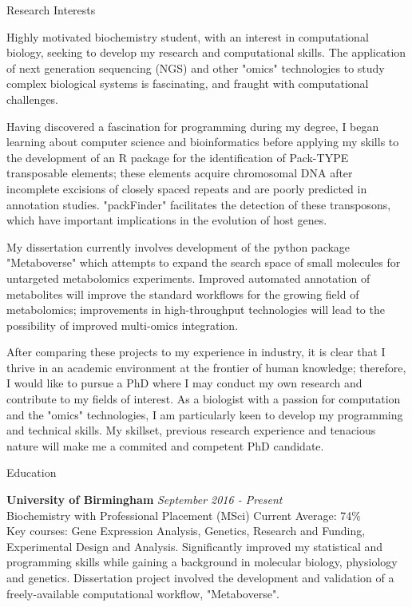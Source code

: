 \documentclass{resume}
\begin{document}
\begin{rSection}{Research Interests}

Highly motivated biochemistry student, with an interest in computational biology, seeking to develop my research and computational skills. The application of next generation sequencing (NGS) and other "omics" technologies to study complex biological systems is fascinating, and fraught with computational challenges. 

Having discovered a fascination for programming during my degree, I began learning about computer science and bioinformatics before applying my skills to the development of an R package for the identification of Pack-TYPE transposable elements; these elements acquire chromosomal DNA after incomplete excisions of closely spaced repeats and are poorly predicted in annotation studies. "packFinder" facilitates the detection of these transposons, which have important implications in the evolution of host genes. 

My dissertation currently involves development of the python package "Metaboverse" which attempts to expand the search space of small molecules for untargeted metabolomics experiments. Improved automated annotation of metabolites will improve the standard workflows for the growing field of metabolomics; improvements in high-throughput technologies will lead to the possibility of improved multi-omics integration.

After comparing these projects to my experience in industry, it is clear that I thrive in an academic environment at the frontier of human knowledge; therefore, I would like to pursue a PhD where I may conduct my own research and contribute to my fields of interest. As a biologist with a passion for computation and the "omics" technologies, I am particularly keen to develop my programming and technical skills. My skillset, previous research experience and tenacious nature will make me a commited and competent PhD candidate. 
 
\end{rSection}
\begin{rSection}{Education}

{\bf University of Birmingham} \hfill {\em September 2016 - Present} 
\\ Biochemistry with Professional Placement (MSci) \hfill {Current Average: 74\%} \smallskip \\
Key courses: Gene Expression Analysis, Genetics, Research and Funding, Experimental Design and Analysis. Significantly improved my statistical and programming skills while gaining a background in molecular biology, physiology and genetics. Dissertation project involved the development and validation of a freely-available computational workflow, "Metaboverse".  \\

\end{rSection}
\end{document}
